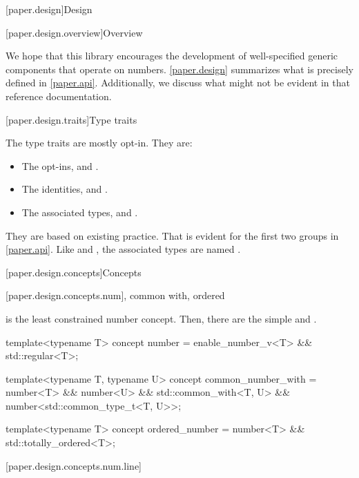 

[paper.design]{Design}

[paper.design.overview]{Overview}

\pnum
We hope that this library encourages the development of well-specified generic components that operate on numbers.
\ref{paper.design} summarizes what is precisely defined in \ref{paper.api}.
Additionally, we discuss what might not be evident in that reference documentation.

[paper.design.traits]{Type traits}

\pnum
The type traits are mostly opt-in.
They are:
\begin{itemize}
\item The  opt-ins,  and .
\item The identities,  and .
\item The associated types,  and .
\end{itemize}

\pnum
They are based on existing practice.
That is evident for the first two groups in \ref{paper.api}.
Like  and ,
the associated types are named .

[paper.design.concepts]{Concepts}

[paper.design.concepts.num]{, common with, ordered}

\pnum
{} is the least constrained number concept.
Then, there are the simple  and .
\begin{codeblock}
template<typename T>
concept number = enable_number_v<T> && std::regular<T>;

template<typename T, typename U>
concept common_number_with =
  number<T> && number<U> && std::common_with<T, U> && number<std::common_type_t<T, U>>;

template<typename T>
concept ordered_number = number<T> && std::totally_ordered<T>;
\end{codeblock}

[paper.design.concepts.num.line]{}

